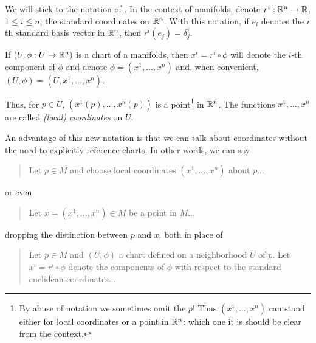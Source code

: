 \begin{notation}\label{ntn:coords}
  We will stick to the notation of \cite{book:tu}.
  In the context of manifolds, denote $r^i: \mathbb{R}^n\to\mathbb{R}$, $1\leq i\leq n$, the standard coordinates on $\mathbb{R}^n$. With this notation, if $e_i$ denotes the $i$th standard basis vector in $\mathbb{R}^n$, then $r^i(e_j) = \delta^i_j$.

  If $(U, \phi:U\to\mathbb{R}^n)$ is a chart of a manifolds, then $x^i = r^i\circ\phi$ will denote the $i$-th component of $\phi$ and denote $\phi = (x^1, \ldots, x^n)$ and, when convenient, $(U,\phi) = (U, x^1, \ldots, x^n)$.

  Thus, for $p\in U$, $(x^1(p), \ldots, x^n(p))$ is a point\footnote{By abuse of notation we sometimes omit the $p$! Thus $(x^1, \ldots, x^n)$ can stand either for local coordinates or a point in $\mathbb{R}^n$: which one it is should be clear from the context.} in $\mathbb{R}^n$. The functions $x^1, \ldots, x^n$  are called \emph{(local) coordinates} on $U$.
\end{notation}

An advantage of this new notation is that we can talk about coordinates without the need to explicitly reference charts. In other words, we can say
\begin{quote}
  Let $p\in M$ and choose local coordinates $(x^1, \ldots, x^n)$ about $p$...
\end{quote}
or even
\begin{quote}
  Let $x=(x^1, \ldots, x^n)\in M$ be a point in $M$...
\end{quote}
dropping the distinction between $p$ and $x$, both in place of
\begin{quote}
  Let $p \in M$ and $(U, \phi)$ a chart defined on a neighborhood $U$ of $p$.
  Let $x^i = r^i \circ\phi$ denote the components of $\phi$ with respect to the standard euclidean coordinates...
\end{quote}

